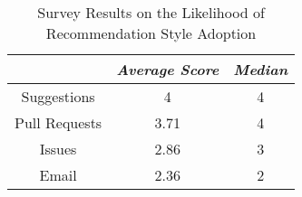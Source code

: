 \begin{table}[H]
\centering
\caption{Survey Results on the Likelihood of Recommendation Style Adoption}
\begin{tabular}{ |c|c|c| } \hline
  & \textit{\textbf{Average Score}} & \textit{\textbf{Median}} \\ \hline
 Suggestions & 4 & 4 \\ \hline 
 Pull Requests & 3.71 & 4 \\ \hline 
 Issues & 2.86 & 3 \\ \hline 
 Email & 2.36 & 2 \\ \hline 
\end{tabular}
\label{tab:styles-results}
\end{table}
